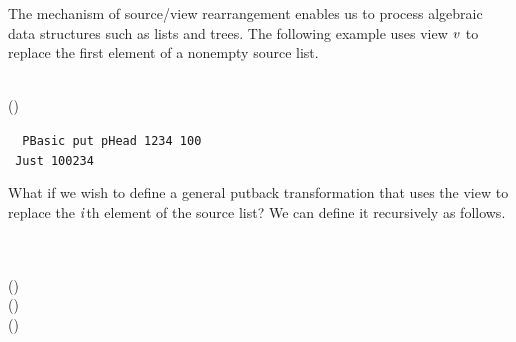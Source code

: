 The mechanism of source/view rearrangement enables us to
process algebraic data structures such as
lists and trees. The following example uses view \ensuremath{\Varid{v}} to
replace the first element of a nonempty source list.
\begin{hscode}\SaveRestoreHook
{}%
%
\>[B]{}\mathbin{::}\;\Rightarrow {}\;\<[E]%
\\
\>[B]{}\mathrel{=}\mathbin{\$}()\;\<[E]%
\ColumnHook
\end{hscode}\resethooks
\begin{tabbing}\tt
~PBasic~put~pHead~1234~100\\
\tt ~Just~100234
\end{tabbing}
What if we wish to define a general putback transformation 
that uses the view to replace the \ensuremath{\Varid{i}}th element of the source list?
We can define it recursively as follows.
\begin{hscode}\SaveRestoreHook
{}%
%
%
%
%
%
\>[B]{}\mathbin{::}\;\Rightarrow {}\to {}\;\<[E]%
\\
\>[B]{}\;\mathrel{=}{}\<[11]%
\>[11]{}\;\equiv {}\;\;\<[E]%
\\
\>[11]{}\<[17]%
\>[17]{}\mathbin{\$}()\mathbin{\$}{}\<[E]%
\\
\>[17]{}\<[20]%
\>[20]{}\mathbin{\$}()\mathbin{\$}{}\<[E]%
\\
\>[20]{}\<[23]%
\>[23]{}\;(\mathbin{-}){}\<[E]%
\ColumnHook
\end{hscode}\resethooks
